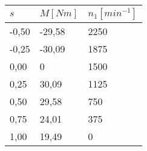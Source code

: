 \begin{table}[htbp]
    \centering
    \begin{tabularx}{\columnwidth}{XXX}
        \toprule
        $s$   & $M[Nm]$ & $n_1[min^{-1}]$ \\
        \midrule
        -0,50 & -29,58  & 2250            \\
        -0,25 & -30,09  & 1875            \\
        0,00  & 0       & 1500            \\
        0,25  & 30,09   & 1125            \\
        0,50  & 29,58   & 750             \\
        0,75  & 24,01   & 375             \\
        1,00  & 19,49   & 0               \\
        \bottomrule
    \end{tabularx}
    \caption{}
    \label{tab:sigma_vs_M_n1}
\end{table}
